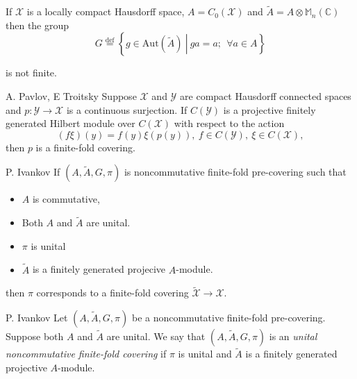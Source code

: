 \documentclass{beamer}
\theoremstyle{plain}
\newcommand{\be}{\begin{equation}}
\newcommand{\ee}{\end{equation}}
\newcommand{\Aut}{\mathrm{Aut}}
\newcommand{\bydef}{\stackrel{\mathrm{def}}{=}}
\begin{document}
\begin{frame}
\begin{example}
If $\mathcal{X}$ is a locally compact Hausdorff space, $A = C_0\left(\mathcal{X}\right)$ and $\widetilde{A}= A\otimes \mathbb{M}_n\left(\mathbb{C} \right)$ then the group
			\be\nonumber
G \bydef \left\{ \left.g \in \Aut\left(\widetilde{A} \right)~\right|~ ga = a;~~\forall a \in A\right\}
\ee

is not finite.
\end{example}
	\begin{theorem}\alert{A. Pavlov, E Troitsky}
		Suppose $\mathcal X$ and $\mathcal Y$ are compact Hausdorff connected spaces and $p :\mathcal  Y \to \mathcal X$
is a continuous surjection. If $C(\mathcal Y )$ is a projective finitely generated Hilbert module over
$C(\mathcal X)$ with respect to the action
\begin{equation*}
(f\xi)(y) = f(y)\xi(p(y)), ~ f \in  C(\mathcal Y ), ~ \xi \in  C(\mathcal X),
\end{equation*}
then $p$ is a finite-fold  covering.
	\end{theorem}
\end{frame}
\begin{frame}
	
\begin{corollary}\alert{P. Ivankov}
	If $\left(A, \widetilde{A}, G, \pi \right)$ is noncommutative finite-fold  pre-covering such that
	\begin{itemize}
		\item $A$ is commutative,
		\item Both $A$ and $\widetilde{A}$ are unital.
		\item $\pi$ is unital 
	\item $\widetilde{A}$	is a finitely generated projecive $A$-module.
	\end{itemize}
	then $\pi$ corresponds to a finite-fold covering $ \widetilde{\mathcal  X}\to \mathcal  X$.
\end{corollary}
\begin{definition}
	\alert{P. Ivankov}
	  	Let $\left(A, \widetilde{A}, G, \pi \right)$ be a  noncommutative finite-fold  pre-covering. Suppose both $A$ and  $\widetilde{A}$ are unital. We say that $\left(A, \widetilde{A}, G, \pi \right)$ is an \textit{unital noncommutative finite-fold  covering} if  $\pi$ is unital and $\widetilde{A}$ is a finitely generated projective  $A$-module.
\end{definition}
\end{frame}
\end{document}
